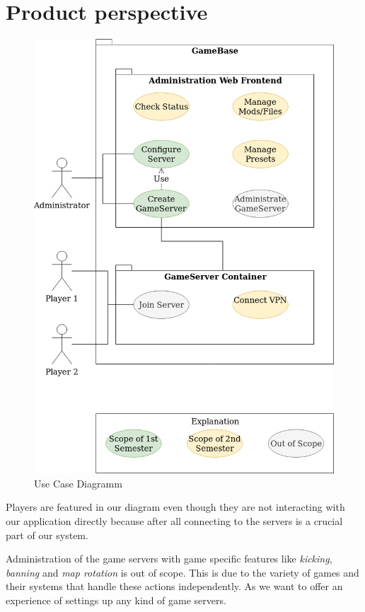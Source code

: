 \documentclass[a4paper,12pt,chapterprefix=false,bibliography=totoc,listof=totoc,]{scrreprt}
\begin{document}
\section{Product perspective}
\begin{figure}
	\includegraphics[width=\textwidth]{diagramms/Use_Case_Diagramm.png}
	\caption{Use Case Diagramm}
	\label{fig:ucd}
\end{figure}
Players are featured in our diagram even though they are not interacting with our application directly because after all connecting to the servers is a crucial part of our system.

Administration of the game servers with game specific features like \emph{kicking}, \emph{banning} and \emph{map rotation} is out of scope. This is due to the variety of games and their systems that handle these actions independently. As we want to offer an experience of settings up any kind of game servers.
\end{document}
